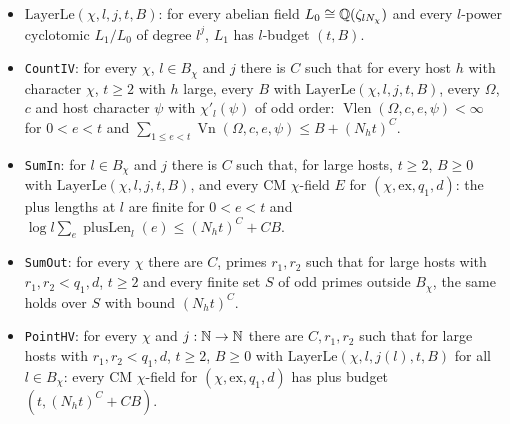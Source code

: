 \begin{definition}\label{sha:assembly}
\begin{itemize}
\item $\mathrm{LayerLe}(\chi,l,j,t,B)$: for every abelian field $L_0\cong\mathbb{Q}(\zeta_{lN_{\chi}})$
and every $l$-power cyclotomic $L_1/L_0$ of degree $l^j$, $L_1$ has $l$-budget $(t,B)$.
\item \texttt{CountIV}: for every $\chi$, $l\in B_{\chi}$ and $j$ there is $C$ such that for every
host $h$ with character $\chi$, $t\ge2$ with $h$ large, every $B$ with
$\mathrm{LayerLe}(\chi,l,j,t,B)$, every $\Omega$, $c$ and host character $\psi$ with
$\chi'_l(\psi)$ of odd order: $\operatorname{Vlen}(\Omega,c,e,\psi)<\infty$ for $0<e<t$ and
$\sum_{1\le e<t}\operatorname{Vn}(\Omega,c,e,\psi)\le B+(N_ht)^C$.
\item \texttt{SumIn}: for $l\in B_{\chi}$ and $j$ there is $C$ such that, for large hosts,
$t\ge2$, $B\ge0$ with $\mathrm{LayerLe}(\chi,l,j,t,B)$, and every CM $\chi$-field $E$ for
$(\chi,\mathrm{ex},q_1,d)$: the plus lengths at $l$ are finite for $0<e<t$ and
$\log l\sum_{e}\operatorname{plusLen}_l(e)\le(N_ht)^C+CB$.
\item \texttt{SumOut}: for every $\chi$ there are $C$, primes $r_1,r_2$ such that for large
hosts with $r_1,r_2<q_1,d$, $t\ge2$ and every finite set $S$ of odd primes outside $B_{\chi}$,
the same holds over $S$ with bound $(N_ht)^C$.
\item \texttt{PointHV}: for every $\chi$ and $j:\mathbb{N}\to\mathbb{N}$ there are $C,r_1,r_2$ such that for
large hosts with $r_1,r_2<q_1,d$, $t\ge2$, $B\ge0$ with $\mathrm{LayerLe}(\chi,l,j(l),t,B)$ for
all $l\in B_{\chi}$: every CM $\chi$-field for $(\chi,\mathrm{ex},q_1,d)$ has plus budget
$(t,(N_ht)^C+CB)$.
\end{itemize}
\end{definition}

